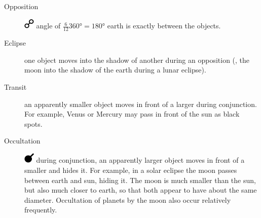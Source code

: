 \documentclass[british,final,landscape]{scrartcl}
\begin{document}
\begin{refsection}
\begin{description}
   \item[Opposition]{\includegraphics[width=5mm]{Astrology/Opposition} angle of \(\frac{6}{12} \ang{360} = \ang{180}\) earth is exactly between the objects.}
   \item[Eclipse]{one object moves into the shadow of another during an opposition (, the moon into the shadow of the earth during a lunar eclipse). }
   \item[Transit]{an apparently smaller object moves in front of a larger during conjunction. For example, Venus or Mercury may pass in front of the sun as black spots. }
   \item[Occultation]{\includegraphics[width=5mm]{Astrology/Occultation} during conjunction, an apparently larger object moves in front of a smaller and hides it. For example, in a solar eclipse the moon passes between earth and sun, hiding it. The moon is much smaller than the sun, but also much closer to earth, so that both appear to have about the same diameter. Occultation of planets by the moon also occur relatively frequently.}
 \end{description}


\end{refsection}
\end{document}

